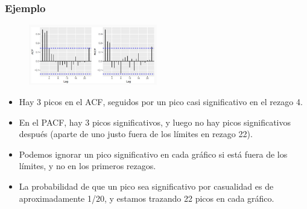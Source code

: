 \documentclass[10pt]{beamer}
\begin{document}
\begin{frame}[fragile]
\frametitle{Ejemplo}


\begin{figure}
\begin{center}
    \includegraphics[width=0.5\textwidth]{Imagen14.JPG}
\end{center}
\end{figure}

{\small
\begin{itemize}
\item Hay 3 picos en el ACF, seguidos por un pico casi significativo en el rezago 4. 
\item En el PACF, hay 3 picos significativos, y luego no hay picos significativos después (aparte de uno justo fuera de los límites en rezago 22).
\item Podemos ignorar un pico significativo en cada gráfico si está fuera de los límites, y no en los primeros rezagos.
\item La probabilidad de que un pico sea significativo por casualidad es de aproximadamente 1/20, y estamos trazando 22 picos en cada gráfico.
\end{itemize}
}

\begin{center}
\small {}
\end{center}

\end{frame}


\end{document}
